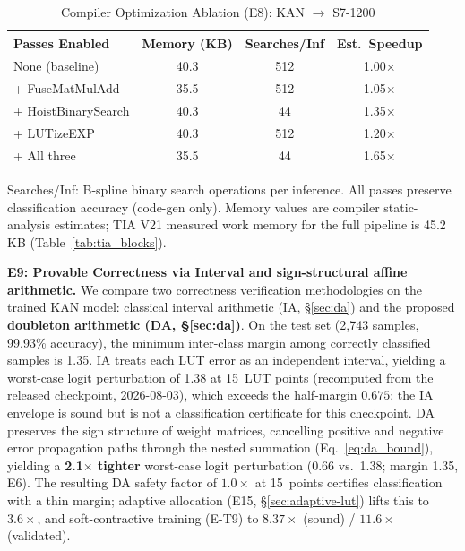 \documentclass[journal,onecolumn]{IEEEtran}
\begin{document}
\begin{table}[t]
\centering
\caption{Compiler Optimization Ablation (E8): KAN $\to$ S7-1200}
\label{tab:opt_ablation}
\footnotesize
\begin{tabular}{@{}lccc@{}}
\toprule
\textbf{Passes Enabled} & \textbf{Memory (KB)} & \textbf{Searches/Inf} & \textbf{Est.\ Speedup} \\
\midrule
None (baseline)        & 40.3 & 512 & 1.00$\times$ \\
+ FuseMatMulAdd        & 35.5 & 512 & 1.05$\times$ \\
+ HoistBinarySearch    & 40.3 & 44  & 1.35$\times$ \\
+ LUTizeEXP            & 40.3 & 512 & 1.20$\times$ \\
+ All three            & 35.5 & 44  & 1.65$\times$ \\
\bottomrule
\end{tabular}
\vspace{1pt}
{\scriptsize Searches/Inf: B-spline binary search operations per inference.
All passes preserve classification accuracy (code-gen only).
Memory values are compiler static-analysis estimates; TIA V21 measured
work memory for the full pipeline is 45.2\,KB (Table~\ref{tab:tia_blocks}).}
\end{table}

\noindent\textbf{E9: Provable Correctness via Interval and sign-structural affine arithmetic.}
We compare two correctness verification methodologies on the trained KAN
model: classical interval arithmetic (IA, {\S}\ref{sec:da}) and the proposed
\textbf{doubleton arithmetic (DA, {\S}\ref{sec:da})}. On the test set (2,743 samples,
99.93\% accuracy), the minimum inter-class margin among correctly classified
samples is 1.35. IA treats each LUT error as an independent interval,
yielding a worst-case logit perturbation of 1.38 at 15~LUT points
(recomputed from the released checkpoint, 2026-08-03), which exceeds the
half-margin $0.675$: the IA envelope is sound but is not a classification
certificate for this checkpoint. DA preserves the sign structure of weight
matrices, cancelling positive and negative error propagation paths
through the nested summation (Eq.~\ref{eq:da_bound}), yielding a
\textbf{2.1$\times$ tighter} worst-case logit perturbation (0.66
vs.\ 1.38; margin 1.35, E6). The resulting DA safety factor of $1.0\times$
at 15~points certifies classification with a thin margin; adaptive
allocation (E15, {\S}\ref{sec:adaptive-lut}) lifts this to $3.6\times$,
and soft-contractive training (E-T9) to $8.37\times$ (sound) /
$11.6\times$ (validated).
\end{document}

